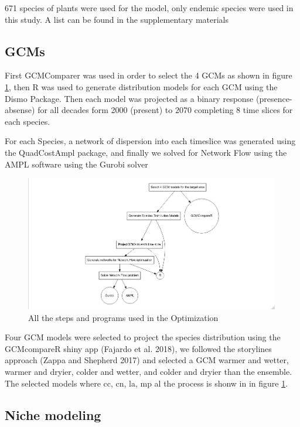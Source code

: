 \documentclass[]{article}
\begin{document}
671 species of plants were used for the model, only endemic species were used in this study. A list can be found in the supplementary materials

\hypertarget{gcms}{%
\subsection{GCMs}\label{gcms}}

First GCMComparer was used in order to select the 4 GCMs as shown in figure \ref{fig:Diagrama}, then R was used to generate distribution models for each GCM using the Dismo Package. Then each model was projected as a binary response (presence-absense) for all decades form 2000 (present) to 2070 completing 8 time slices for each species.

For each Species, a network of dispersion into each timeslice was generated using the QuadCostAmpl package, and finally we solved for Network Flow using the AMPL software using the Gurobi solver

\begin{figure}
\includegraphics[width=4.39in]{Diag1} \caption{All the steps and programs used in the Optimization}\label{fig:Diagrama}
\end{figure}

Four GCM models were selected to project the species distribution using the GCMcompareR shiny app (Fajardo et al. 2018), we followed the storylines approach (Zappa and Shepherd 2017) and selected a GCM warmer and wetter, warmer and dryier, colder and wetter, and colder and dryier than the ensemble. The selected models where cc, cn, la, mp al the process is shonw in in figure \ref{fig:Diagrama}.

\hypertarget{niche-modeling}{%
\subsection{Niche modeling}\label{niche-modeling}}
\end{document}
